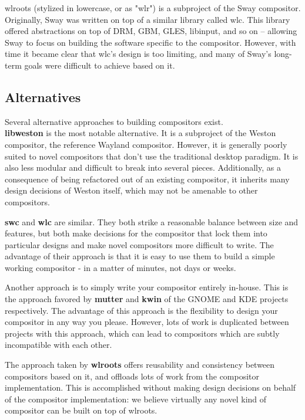 \documentclass{article}
\begin{document}
wlroots (stylized in lowercase, or as "wlr") is a subproject of the Sway
compositor. Originally, Sway was written on top of a similar library called wlc.
This library offered abstractions on top of DRM, GBM, GLES, libinput, and so on
-- allowing Sway to focus on building the software specific to the compositor.
However, with time it became clear that wlc's design is too limiting, and many
of Sway's long-term goals were difficult to achieve based on it.

\subsection{Alternatives}\label{alternatives}

Several alternative approaches to building compositors exist.\\

\textbf{libweston} is the most notable alternative. It is a subproject of the
Weston compositor, the reference Wayland compositor. However, it is generally
poorly suited to novel compositors that don't use the traditional desktop
paradigm. It is also less modular and difficult to break into several pieces.
Additionally, as a consequence of being refactored out of an existing
compositor, it inherits many design decisions of Weston itself, which may not be
amenable to other compositors.

\textbf{swc} and \textbf{wlc} are similar. They both strike a reasonable balance
between size and features, but both make decisions for the compositor that lock
them into particular designs and make novel compositors more difficult to
write. The advantage of their approach is that it is easy to use them to build a
simple working compositor - in a matter of minutes, not days or weeks.

Another approach is to simply write your compositor entirely in-house. This is
the approach favored by \textbf{mutter} and \textbf{kwin} of the GNOME and KDE
projects respectively. The advantage of this approach is the flexibility to
design your compositor in any way you please. However, lots of work is
duplicated between projects with this approach, which can lead to compositors
which are subtly incompatible with each other.

The approach taken by \textbf{wlroots} offers reusability and consistency
between compositors based on it, and offloads lots of work from the compositor
implementation. This is accomplished without making design decisions on behalf
of the compositor implementation: we believe virtually any novel kind of
compositor can be built on top of wlroots.
\end{document}
